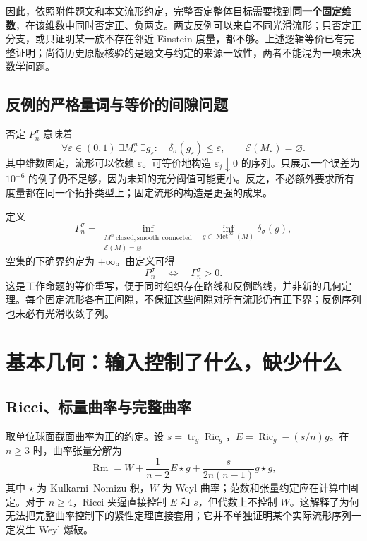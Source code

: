\documentclass[11pt,a4paper]{article}
\theoremstyle{definition}
\newcommand{\Ric}{\operatorname{Ric}}
\newcommand{\Rm}{\operatorname{Rm}}
\newcommand{\tr}{\operatorname{tr}}
\newcommand{\Met}{\operatorname{Met}}
\newcommand{\Ein}{\mathcal E}
\begin{document}
因此，依照附件题文和本文流形约定，完整否定整体目标需要找到\textbf{同一个固定维数}，在该维数中同时否定正、负两支。两支反例可以来自不同光滑流形；只否定正分支，或只证明某一族不存在邻近 Einstein 度量，都不够。上述逻辑等价已有完整证明；尚待历史原版核验的是题文与约定的来源一致性，两者不能混为一项未决数学问题。

\subsection{反例的严格量词与等价的间隙问题}

否定 $P_n^\sigma$ 意味着
\begin{equation}\label{eq:neg}
\forall\varepsilon\in(0,1)\ \exists M_\varepsilon^n\ \exists g_\varepsilon:\quad
\delta_\sigma(g_\varepsilon)\le\varepsilon,\qquad
\Ein(M_\varepsilon)=\varnothing.
\end{equation}
其中维数固定，流形可以依赖 $\varepsilon$。可等价地构造 $\varepsilon_j\downarrow0$ 的序列。只展示一个误差为 $10^{-6}$ 的例子仍不足够，因为未知的充分阈值可能更小。反之，不必额外要求所有度量都在同一个拓扑类型上；固定流形的构造是更强的成果。

定义
\[
\Gamma_n^\sigma=
\inf_{\substack{M^n\ \mathrm{closed,smooth,connected}\\\Ein(M)=\varnothing}}
\ \inf_{g\in\Met^\infty(M)}\delta_\sigma(g),
\]
空集的下确界约定为 $+\infty$。由定义可得
\[
P_n^\sigma\quad\Longleftrightarrow\quad\Gamma_n^\sigma>0.
\]
这是工作命题的等价重写，便于同时组织存在路线和反例路线，并非新的几何定理。每个固定流形各有正间隙，不保证这些间隙对所有流形仍有正下界；反例序列也未必有光滑收敛子列。

\section{基本几何：输入控制了什么，缺少什么}

\subsection{Ricci、标量曲率与完整曲率}

取单位球面截面曲率为正的约定。设 $s=\tr_g\Ric_g$，$E=\Ric_g-(s/n)g$。在 $n\ge3$ 时，曲率张量分解为
\[
\Rm=W+\frac{1}{n-2}E\mathbin{\star} g
+\frac{s}{2n(n-1)}g\mathbin{\star} g,
\]
其中 $\mathbin{\star}$ 为 Kulkarni--Nomizu 积，$W$ 为 Weyl 曲率；范数和张量约定应在计算中固定。对于 $n\ge4$，Ricci 夹逼直接控制 $E$ 和 $s$，但代数上不控制 $W$。这解释了为何无法把完整曲率控制下的紧性定理直接套用；它并不单独证明某个实际流形序列一定发生 Weyl 爆破。
\end{document}
